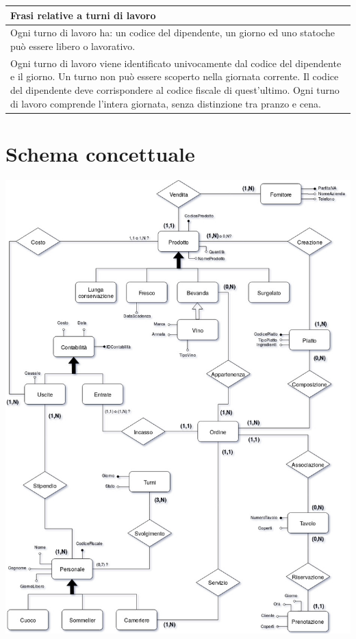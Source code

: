 \begin{longtable}{|p{15.5cm}|}
    \hline
    \textbf{Frasi relative a turni di lavoro} \\ \hline
    Ogni turno di lavoro ha: un codice del dipendente, un giorno ed uno statoche può essere libero o lavorativo. \\
Ogni turno di lavoro viene identificato univocamente dal codice del dipendente e il giorno.
Un turno non può essere scoperto nella giornata corrente. 
Il codice del dipendente deve corrispondere al codice fiscale di quest'ultimo. 
Ogni turno di lavoro comprende l'intera giornata, senza distinzione tra pranzo e cena.
    \\ \hline
\end{longtable}


\section{Schema concettuale} %
\includegraphics[width=1.1\textwidth]{doc/schema}

